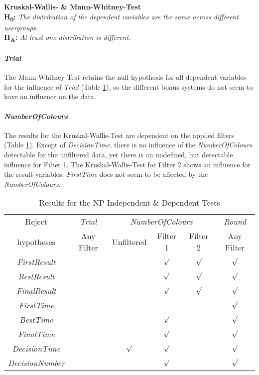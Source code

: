 \textbf{Kruskal-Wallis- \& Mann-Whitney-Test} \\
\textbf{H\textsubscript{0}:} \textit{The distribution of the dependent variables are the same across different usergroups.}\\
\textbf{H\textsubscript{A}:} \textit{At least one distribution is different.}

\paragraph{\textit{Trial}}
The Mann-Whitney-Test retains the null hypothesis for all dependent variables for the influence of \textit{Trial} (Table \ref{NPTest}), so the different bonus systems do not seem to have an influence on the data.

\paragraph{\textit{NumberOfColours}}
The results for the Kruskal-Wallis-Test are dependent on the applied filters (Table \ref{NPTest}). Except of \textit{DecisionTime}, there is no influence of the \textit{NumberOfColours} detectable for the unfiltered data, yet there is an undefined, but detectable influence for Filter 1. The Kruskal-Wallis-Test for Filter 2 shows an influence for the result variables. \textit{FirstTime} does not seem to be affected by the \textit{NumberOfColours}. 
\begin{table}[htbp]
  \centering
  \caption{Results for the NP Independent \& Dependent Tests}
    \label{Results for the NP Test}
    \begin{tabular}{c|c|ccc|c}
    \toprule
       Reject   & \textit{Trial} & \multicolumn{3}{c|}{\textit{NumberOfColours}} & \textit{Round} \\
       hypotheses  & Any Filter & Unfiltered & Filter 1 & \multicolumn{1}{c|}{Filter 2} & Any Filter \\
    \midrule
	\textit{FirstResult} & &              & $\surd$     & $\surd$     &  $\surd$ \\
    \textit{BestResult} & &         	  & $\surd$     & $\surd$	   & $\surd$\\
    \textit{FinalResult} & &         	  & $\surd$ 	 & $\surd$	   & $\surd$ \\
    \textit{FirstTime} & &         		  &       		 &       	   & $\surd$ \\
    \textit{BestTime} & &         		  & $\surd$     &              & $\surd$ \\
    \textit{FinalTime} & &         		  & $\surd$     &              & $\surd$ \\
    \textit{DecisionTime} & &  $\surd$    & $\surd$     &       	   & $\surd$ \\
    \textit{DecisionNumber} & &           & $\surd$     &       	   & $\surd$ \\
    \bottomrule
    \end{tabular}%
  \label{NPTest}%
\end{table}%

